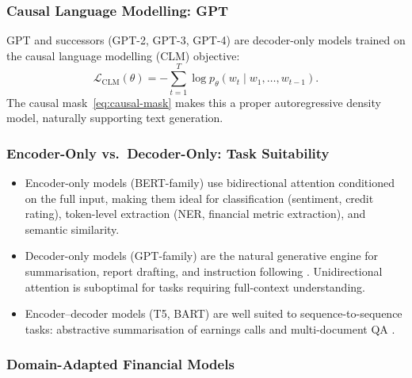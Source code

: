 \begin{deepdive}
\subsubsection{Causal Language Modelling: GPT}

GPT \cite{radford2018gpt} %
and successors (GPT-2, GPT-3, GPT-4) are decoder-only models trained on the causal
language modelling (CLM) objective:
\begin{equation}
  \mathcal{L}_{\mathrm{CLM}}(\theta)
  = -\sum_{t=1}^{T} \log p_\theta(w_t \mid w_1, \ldots, w_{t-1}).
  \label{eq:clm-loss}
\end{equation}
The causal mask~\eqref{eq:causal-mask} makes this a proper autoregressive density
model, naturally supporting text generation.

\subsubsection{Encoder-Only vs.\ Decoder-Only: Task Suitability}

\begin{itemize}
  \item Encoder-only models (BERT-family) use bidirectional attention
        conditioned on the full input, making them ideal for
        classification (sentiment, credit rating), token-level
        extraction (NER, financial metric extraction), and semantic
        similarity.

  \item Decoder-only models (GPT-family) are the natural generative
        engine for summarisation, report drafting, and instruction
        following \cite{ouyang2022training}. %
        Unidirectional attention is suboptimal for tasks requiring
        full-context understanding.

  \item Encoder--decoder models (T5, BART) are well suited to
        sequence-to-sequence tasks: abstractive summarisation of
        earnings calls and multi-document QA \cite{lewis2020bart}. %
\end{itemize}

\subsubsection{Domain-Adapted Financial Models}


\end{deepdive}
